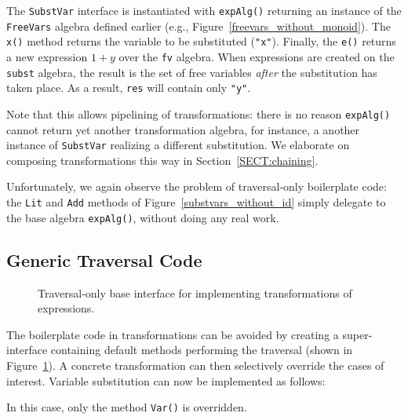 The \lstinline{SubstVar} interface is instantiated with \lstinline{expAlg()} returning an instance of the \lstinline{FreeVars} algebra defined earlier (e.g., Figure~\ref{freevars_without_monoid}). The \lstinline{x()} method returns the variable to be substituted (\lstinline{"x"}). Finally, the \lstinline{e()} returns a new expression $1+y$ over the \lstinline{fv} algebra.
When expressions are created on the \lstinline{subst} algebra, the result is the set of free variables \textit{after} the substitution has taken place. As a result, \lstinline{res} will contain only \lstinline{"y"}.

Note that this allows pipelining of transformations: there is no reason
\lstinline{expAlg()} cannot return yet another transformation
algebra, for instance, a another instance of \lstinline{SubstVar} realizing a different substitution. We elaborate on composing transformations this way in Section~\ref{SECT:chaining}.


Unfortunately, we again observe the problem of traversal-only boilerplate code: the
\lstinline{Lit} and \lstinline{Add} methods of Figure~\ref{substvars_without_id} simply delegate to the
base algebra \lstinline{expAlg()}, without doing any real work.

\subsection{Generic Traversal Code}

\begin{figure}[t]
\nocaptionrule
\caption{Traversal-only base interface for implementing transformations of expressions.}
\label{generic_transform}
\end{figure}

The boilerplate code in transformations can be avoided by creating a
super-interface containing default methods performing the traversal
(shown in Figure~\ref{generic_transform}). A concrete transformation can
then selectively override the cases of interest. Variable substitution
can now be implemented as follows:


\noindent In
this case, only the method \lstinline{Var()} is overridden.


